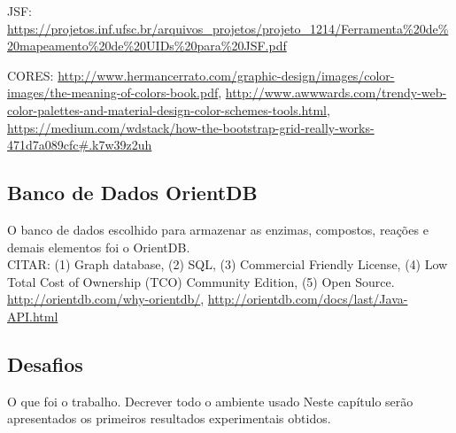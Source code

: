 \indent JSF: \url{https://projetos.inf.ufsc.br/arquivos_projetos/projeto_1214/Ferramenta\%20de\%20mapeamento\%20de\%20UIDs\%20para\%20JSF.pdf}

\indent CORES: \url{http://www.hermancerrato.com/graphic-design/images/color-images/the-meaning-of-colors-book.pdf}, \url{http://www.awwwards.com/trendy-web-color-palettes-and-material-design-color-schemes-tools.html}, \url{https://medium.com/wdstack/how-the-bootstrap-grid-really-works-471d7a089cfc#.k7w39z2uh}


\subsection{Banco de Dados OrientDB}

\indent O banco de dados escolhido para armazenar as enzimas, compostos, reações e demais elementos foi o OrientDB.\\
CITAR: (1) Graph database, (2) SQL, (3) Commercial Friendly License, (4) Low Total Cost of Ownership (TCO) Community Edition, (5) Open Source. \url{http://orientdb.com/why-orientdb/}, \url{http://orientdb.com/docs/last/Java-API.html}

\subsection{Desafios}
 
O que foi o trabalho. 
Decrever todo o ambiente usado
Neste capítulo serão apresentados os primeiros resultados experimentais obtidos.